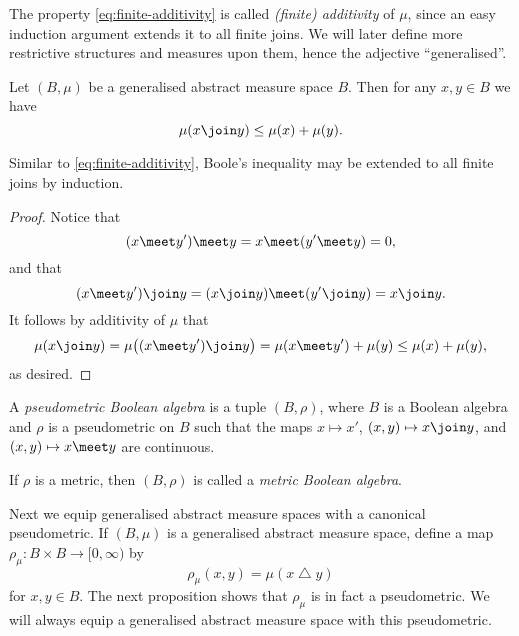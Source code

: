 \documentclass[article, a4paper, 11pt, oneside]{memoir}
\numberwithin{equation}{chapter}
\renewcommand{\symdiff}{\mathbin{\triangle}}
\begin{document}
The property \cref{eq:finite-additivity} is called \emph{(finite) additivity} of $\mu$, since an easy induction argument extends it to all finite joins. We will later define more restrictive structures and measures upon them, hence the adjective \enquote{generalised}.

\begin{proposition}
    Let $(B,\mu)$ be a generalised abstract measure space $B$. Then for any $x,y \in B$ we have
    \begin{equation*}
        \mu(x \join y)
            \leq \mu(x) + \mu(y).
    \end{equation*}
\end{proposition}
%
Similar to \eqref{eq:finite-additivity}, Boole's inequality may be extended to all finite joins by induction.

\begin{proof}
    Notice that
    \begin{equation*}
        (x \meet y') \meet y = x \meet (y' \meet y) = 0,
    \end{equation*}
    and that
    \begin{equation*}
        (x \meet y') \join y = (x \join y) \meet (y' \join y) = x \join y.
    \end{equation*}
    It follows by additivity of $\mu$ that
    \begin{equation*}
        \mu(x \join y)
            = \mu \bigl( (x \meet y') \join y \bigr)
            = \mu(x \meet y') + \mu(y)
            \leq \mu(x) + \mu(y),
    \end{equation*}
    as desired.
\end{proof}


\begin{definition}
    A \emph{pseudometric Boolean algebra} is a tuple $(B,\rho)$, where $B$ is a Boolean algebra and $\rho$ is a pseudometric on $B$ such that the maps $x \mapsto x'$, $(x,y) \mapsto x \join y$, and $(x,y) \mapsto x \meet y$ are continuous.

    If $\rho$ is a metric, then $(B,\rho)$ is called a \emph{metric Boolean algebra}.
\end{definition}

Next we equip generalised abstract measure spaces with a canonical pseudometric. If $(B,\mu)$ is a generalised abstract measure space, define a map $\rho_\mu \colon B \times B \to [0,\infty)$ by
%
\begin{equation}
    \label{eq:Boolean-metric}
    \rho_\mu(x,y)
        = \mu(x \symdiff y)
\end{equation}
%
for $x,y \in B$. The next proposition shows that $\rho_\mu$ is in fact a pseudometric. We will always equip a generalised abstract measure space with this pseudometric.
\end{document}
